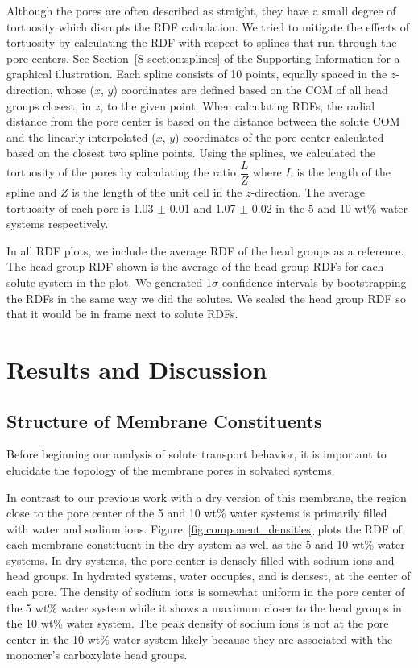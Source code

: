 \documentclass[journal=jpcbfk,manuscript=article]{achemso}
\begin{document}
  Although the pores are often described as straight, they have a
  small degree of tortuosity which disrupts the RDF calculation. We 
  tried to mitigate the effects of tortuosity by calculating the RDF
  with respect to splines that run through the pore centers. See
  Section~\ref{S-section:splines} of the Supporting Information for 
  a graphical illustration. Each spline consists of 10 points, equally
  spaced in the $z$-direction, whose ($x$, $y$) coordinates are defined
  based on the COM of all head groups closest, in $z$, to the
  given point. When calculating RDFs, the radial distance from the pore 
  center is based on the distance between the solute COM and
  the linearly interpolated ($x$, $y$) coordinates of the pore center 
  calculated based on the closest two spline points. Using the splines, 
  we calculated the tortuosity of the pores by calculating the ratio 
  $\dfrac{L}{Z}$ where $L$ is the length of the spline and $Z$ is the 
  length of the unit cell in the $z$-direction. The average tortuosity
  of each pore is 1.03 $\pm$ 0.01 and 1.07 $\pm$ 0.02 in the 5 and 10 wt\%
  water systems respectively.
  
  In all RDF plots, we include the average RDF of the head groups as a 
  reference. The head group RDF shown is the average of the head group
  RDFs for each solute system in the plot. We generated 1$\sigma$ 
  confidence intervals by bootstrapping the RDFs in the same way we did
  the solutes. We scaled the head group RDF so that it would be in frame
  next to solute RDFs.
   
  \section{Results and Discussion}
  
  \subsection{Structure of Membrane Constituents}\label{section:membrane_components} 
  
  Before beginning our analysis of solute transport behavior, it is important to
  elucidate the topology of the membrane pores in solvated systems.  
  
  In contrast to our previous work with a dry version of this membrane, the 
  region close to the pore center of the 5 and 10 wt\% water systems is 
  primarily filled with water and sodium ions. Figure~\ref{fig:component_densities}
  plots the RDF of each membrane constituent in the dry system as well as the
  5 and 10 wt\% water systems. In dry systems, the pore center is densely 
  filled with sodium ions and head groups. In hydrated systems, water occupies, 
  and is densest, at the center of each pore. The density of sodium ions is 
  somewhat uniform in the pore center of the 5 wt\% water system while it shows
  a maximum closer to the head groups in the 10 wt\% water system. The peak 
  density of sodium ions is not at the pore center in the 10 wt\% water system
  likely because they are associated with the monomer's carboxylate head groups.
  
\end{document}
